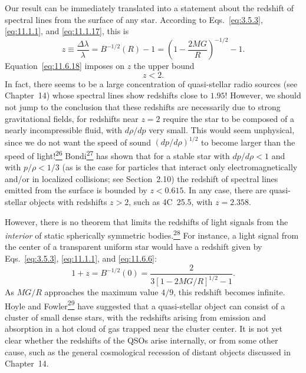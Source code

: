 Our result can be immediately translated into a statement about the redshift
of spectral lines from the surface of any star. According to
Eqs.~\eqref{eq:3.5.3}, \eqref{eq:11.1.1}, and \eqref{eq:11.1.17}, this is
\[
  z\equiv\frac{\Delta\lambda}{\lambda}
  =
  B^{-1/2}(R)-1
  =
  \left(1-\frac{2MG}{R}\right)^{-1/2}-1.
\]
Equation~\eqref{eq:11.6.18} imposes on \(z\) the upper bound
\begin{equation}
  z<2.
  \tag{11.6.20}\label{eq:11.6.20}
\end{equation}
In fact, there seems to be a large concentration of quasi-stellar radio
sources (see Chapter~14) whose spectral lines show redshifts close to \(1.95\)!
However, we should not jump to the conclusion that these redshifts are
necessarily due to strong gravitational fields, for redshifts near \(z=2\)
require the star to be composed of a nearly incompressible fluid, with
\(d\rho/dp\) very small. This would seem unphysical, since we do not want the
speed of sound \((dp/d\rho)^{1/2}\) to become larger than the speed of
light!\hyperref[ch11-ref-26]{\textsuperscript{26}}
Bondi\hyperref[ch11-ref-27]{\textsuperscript{27}} has shown that for a stable
star with \(dp/d\rho<1\) and with \(p/\rho<1/3\) (as is the case for
particles that interact only electromagnetically and/or in localized
collisions; see Section~2.10) the redshift of spectral lines emitted from the
surface is bounded by \(z<0.615\). In any case, there are quasi-stellar
objects with redshifts \(z>2\), such as 4C~25.5, with \(z=2.358\).

However, there is no theorem that limits the redshifts of light signals from
the \emph{interior} of static spherically symmetric
bodies.\hyperref[ch11-ref-28]{\textsuperscript{28}} For instance, a light
signal from the center of a transparent uniform star would have a redshift
given by Eqs.~\eqref{eq:3.5.3}, \eqref{eq:11.1.1}, and
\eqref{eq:11.6.6}:
\[
  1+z
  =
  B^{-1/2}(0)
  =
  \frac{2}{3[1-2MG/R]^{1/2}-1}.
\]
As \(MG/R\) approaches the maximum value \(4/9\), this redshift becomes
infinite. Hoyle and Fowler\hyperref[ch11-ref-29]{\textsuperscript{29}} have
suggested that a quasi-stellar object can consist of a cluster of small dense
stars, with the redshifts arising from emission and absorption in a hot cloud
of gas trapped near the cluster center. It is not yet clear whether the
redshifts of the QSOs arise internally, or from some other cause, such as the
general cosmological recession of distant objects discussed in Chapter~14.
